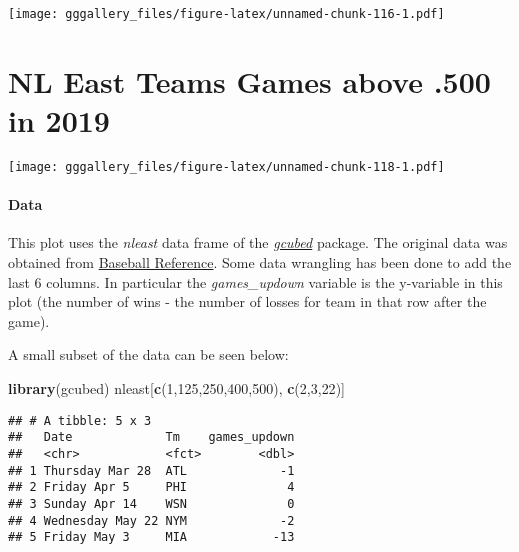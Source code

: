 \documentclass[]{book}
\newenvironment{Shaded}{\begin{snugshade}}{\end{snugshade}}
\newcommand{\DecValTok}[1]{\textcolor[rgb]{0.00,0.00,0.81}{#1}}
\newcommand{\KeywordTok}[1]{\textcolor[rgb]{0.13,0.29,0.53}{\textbf{#1}}}
\newcommand{\NormalTok}[1]{#1}
\begin{document}
\texttt{[image: gggallery\_files/figure-latex/unnamed-chunk-116-1.pdf]}

\hypertarget{nleastgamesabove}{%
\chapter*{NL East Teams Games above .500 in 2019}\label{nleastgamesabove}}

\texttt{[image: gggallery\_files/figure-latex/unnamed-chunk-118-1.pdf]}

\hypertarget{nleastgamesabovedata}{%
\subsubsection*{Data}\label{nleastgamesabovedata}}

This plot uses the \emph{nleast} data frame of the \protect\hyperlink{gcubed}{\emph{gcubed}} package.
The original data was obtained from
\href{https://www.baseball-reference.com/leagues/NL/2019-standings.shtml\#all_standings_E}{Baseball Reference}.
Some data wrangling has been done to add the last 6 columns. In particular the \emph{games\_updown} variable is the y-variable in this plot (the number of wins - the number of losses for team in that row after the game).

A small subset of the data can be seen below:

\begin{Shaded}
\begin{Highlighting}[]
\KeywordTok{library}\NormalTok{(gcubed)}
\NormalTok{nleast[}\KeywordTok{c}\NormalTok{(}\DecValTok{1}\NormalTok{,}\DecValTok{125}\NormalTok{,}\DecValTok{250}\NormalTok{,}\DecValTok{400}\NormalTok{,}\DecValTok{500}\NormalTok{), }\KeywordTok{c}\NormalTok{(}\DecValTok{2}\NormalTok{,}\DecValTok{3}\NormalTok{,}\DecValTok{22}\NormalTok{)]}
\end{Highlighting}
\end{Shaded}

\begin{verbatim}
## # A tibble: 5 x 3
##   Date             Tm    games_updown
##   <chr>            <fct>        <dbl>
## 1 Thursday Mar 28  ATL             -1
## 2 Friday Apr 5     PHI              4
## 3 Sunday Apr 14    WSN              0
## 4 Wednesday May 22 NYM             -2
## 5 Friday May 3     MIA            -13
\end{verbatim}
\end{document}
